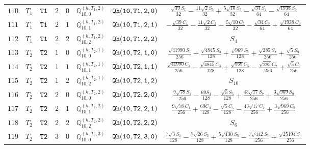 \documentclass[fleqn,8pt]{jsarticle}
\begin{document}
\begin{table}[ht!]
\begin{center}
\begin{tabular}{cccccccc}
$ 110 $ & $ T_{1} $ & $ {\tt T1} $ & $ 2 $ & $ 0 $ & $ \mathbb{Q}_{10,0}^{(h,T_{1},2)} $ & $ {\tt Qh(10,T1,2,0)} $ & $ \frac{\sqrt{39} S_{1}}{32} - \frac{11 \sqrt{2} S_{3}}{32} + \frac{5 \sqrt{10} S_{5}}{32} - \frac{\sqrt{34} S_{7}}{64} - \frac{\sqrt{1938} S_{9}}{64} $ \\
$ 111 $ & $ T_{1} $ & $ {\tt T1} $ & $ 2 $ & $ 1 $ & $ \mathbb{Q}_{10,1}^{(h,T_{1},2)} $ & $ {\tt Qh(10,T1,2,1)} $ & $ - \frac{\sqrt{39} C_{1}}{32} - \frac{11 \sqrt{2} C_{3}}{32} - \frac{5 \sqrt{10} C_{5}}{32} - \frac{\sqrt{34} C_{7}}{64} + \frac{\sqrt{1938} C_{9}}{64} $ \\
$ 112 $ & $ T_{1} $ & $ {\tt T1} $ & $ 2 $ & $ 2 $ & $ \mathbb{Q}_{10,2}^{(h,T_{1},2)} $ & $ {\tt Qh(10,T1,2,2)} $ & $ S_{4} $ \\
$ 113 $ & $ T_{2} $ & $ {\tt T2} $ & $ 1 $ & $ 0 $ & $ \mathbb{Q}_{10,0}^{(h,T_{2},1)} $ & $ {\tt Qh(10,T2,1,0)} $ & $ \frac{\sqrt{41990} S_{1}}{256} + \frac{\sqrt{4845} S_{3}}{128} + \frac{\sqrt{969} S_{5}}{128} + \frac{\sqrt{285} S_{7}}{256} + \frac{\sqrt{5} S_{9}}{256} $ \\
$ 114 $ & $ T_{2} $ & $ {\tt T2} $ & $ 1 $ & $ 1 $ & $ \mathbb{Q}_{10,1}^{(h,T_{2},1)} $ & $ {\tt Qh(10,T2,1,1)} $ & $ \frac{\sqrt{41990} C_{1}}{256} - \frac{\sqrt{4845} C_{3}}{128} + \frac{\sqrt{969} C_{5}}{128} - \frac{\sqrt{285} C_{7}}{256} + \frac{\sqrt{5} C_{9}}{256} $ \\
$ 115 $ & $ T_{2} $ & $ {\tt T2} $ & $ 1 $ & $ 2 $ & $ \mathbb{Q}_{10,2}^{(h,T_{2},1)} $ & $ {\tt Qh(10,T2,1,2)} $ & $ S_{10} $ \\
$ 116 $ & $ T_{2} $ & $ {\tt T2} $ & $ 2 $ & $ 0 $ & $ \mathbb{Q}_{10,0}^{(h,T_{2},2)} $ & $ {\tt Qh(10,T2,2,0)} $ & $ \frac{9 \sqrt{78} S_{1}}{256} - \frac{69 S_{3}}{128} - \frac{\sqrt{5} S_{5}}{128} + \frac{43 \sqrt{17} S_{7}}{256} + \frac{3 \sqrt{969} S_{9}}{256} $ \\
$ 117 $ & $ T_{2} $ & $ {\tt T2} $ & $ 2 $ & $ 1 $ & $ \mathbb{Q}_{10,1}^{(h,T_{2},2)} $ & $ {\tt Qh(10,T2,2,1)} $ & $ \frac{9 \sqrt{78} C_{1}}{256} + \frac{69 C_{3}}{128} - \frac{\sqrt{5} C_{5}}{128} - \frac{43 \sqrt{17} C_{7}}{256} + \frac{3 \sqrt{969} C_{9}}{256} $ \\
$ 118 $ & $ T_{2} $ & $ {\tt T2} $ & $ 2 $ & $ 2 $ & $ \mathbb{Q}_{10,2}^{(h,T_{2},2)} $ & $ {\tt Qh(10,T2,2,2)} $ & $ S_{6} $ \\
$ 119 $ & $ T_{2} $ & $ {\tt T2} $ & $ 3 $ & $ 0 $ & $ \mathbb{Q}_{10,0}^{(h,T_{2},3)} $ & $ {\tt Qh(10,T2,3,0)} $ & $ \frac{7 \sqrt{3} S_{1}}{128} - \frac{7 \sqrt{26} S_{3}}{128} + \frac{5 \sqrt{130} S_{5}}{128} - \frac{7 \sqrt{442} S_{7}}{256} + \frac{\sqrt{25194} S_{9}}{256} $ \\

\end{tabular}
\end{center}
\end{table}
\end{document}
